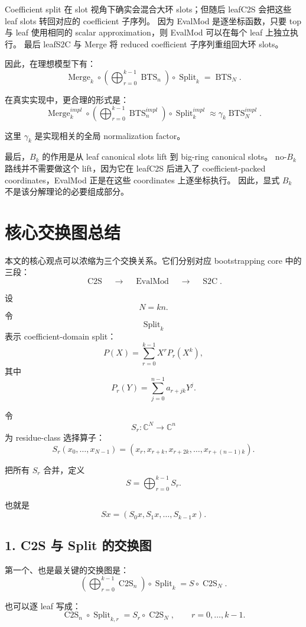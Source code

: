 \documentclass[UTF8,11pt]{ctexart}
\theoremstyle{definition}
\newcommand{\CtwoS}{\operatorname{C2S}}
\newcommand{\StwoC}{\operatorname{S2C}}
\newcommand{\BTS}{\operatorname{BTS}}
\newcommand{\Split}{\operatorname{Split}}
\newcommand{\Merge}{\operatorname{Merge}}
\newcommand{\EvalMod}{\operatorname{EvalMod}}
\begin{document}
Coefficient split 在 slot 视角下确实会混合大环 slots；但随后 leafC2S 会把这些 leaf slots 转回对应的 coefficient 子序列。
因为 EvalMod 是逐坐标函数，只要 top 与 leaf 使用相同的 scalar approximation，则 EvalMod 可以在每个 leaf 上独立执行。
最后 leafS2C 与 Merge 将 reduced coefficient 子序列重组回大环 slots。

因此，在理想模型下有：
\[
\boxed{
\Merge_k
\circ
\left(
\bigoplus_{r=0}^{k-1}\BTS_n
\right)
\circ
\Split_k
=
\BTS_N.
}
\]

在真实实现中，更合理的形式是：
\[
\boxed{
\Merge_k^{impl}
\circ
\left(
\bigoplus_{r=0}^{k-1}\BTS_n^{impl}
\right)
\circ
\Split_k^{impl}
\approx
\gamma_k\BTS_N^{impl}.
}
\]

这里 \(\gamma_k\) 是实现相关的全局 normalization factor。

最后，\(B_k\) 的作用是从 leaf canonical slots lift 到 big-ring canonical slots。
no-\(B_k\) 路线并不需要做这个 lift，因为它在 leafC2S 后进入了 coefficient-packed coordinates，EvalMod 正是在这些 coordinates 上逐坐标执行。
因此，显式 \(B_k\) 不是该分解理论的必要组成部分。

\section{核心交换图总结}

本文的核心观点可以浓缩为三个交换关系。它们分别对应 bootstrapping core 中的三段：
\[
\CtwoS
\quad\longrightarrow\quad
\EvalMod
\quad\longrightarrow\quad
\StwoC.
\]

设
\[
N=kn.
\]
令
\[
\Split_k
\]
表示 coefficient-domain split：
\[
P(X)=\sum_{r=0}^{k-1}X^rP_r(X^k),
\]
其中
\[
P_r(Y)=\sum_{j=0}^{n-1}a_{r+jk}Y^j.
\]

令
\[
S_r:\mathbb C^N\to\mathbb C^n
\]
为 residue-class 选择算子：
\[
S_r(x_0,\ldots,x_{N-1})
=
(x_r,x_{r+k},x_{r+2k},\ldots,x_{r+(n-1)k}).
\]

把所有 \(S_r\) 合并，定义
\[
S=
\bigoplus_{r=0}^{k-1}S_r.
\]

也就是
\[
Sx=(S_0x,S_1x,\ldots,S_{k-1}x).
\]

\subsection*{1. C2S 与 Split 的交换图}

第一个、也是最关键的交换图是：
\[
\boxed{
\left(
\bigoplus_{r=0}^{k-1}\CtwoS_n
\right)
\circ
\Split_k
=
S
\circ
\CtwoS_N.
}
\]

也可以逐 leaf 写成：
\[
\boxed{
\CtwoS_n\circ\Split_{k,r}
=
S_r\circ\CtwoS_N,
\qquad r=0,\ldots,k-1.
}
\]
\end{document}
